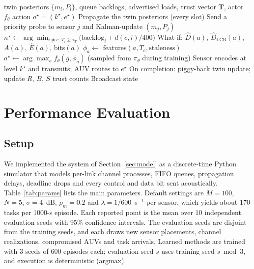 \documentclass[lettersize,journal]{IEEEtran}
\begin{document}
\begin{algorithm}[!t]
\caption{UT-SMART Decision at AUV $c$ for Task $\tau$ From Sensor $j$}
\label{alg:utsmart}
\begin{algorithmic}[1]
\REQUIRE twin posteriors $\{m_l,P_l\}$, queue backlogs, advertised loads, trust vector $\mathbf{T}$, actor $f_\theta$
\ENSURE action $a^\star=(k^\star,e^\star)$
\STATE Propagate the twin posteriors (every slot)
\STATE Send a priority probe to sensor $j$ and Kalman-update $(m_j,P_j)$
\ENDIF
\STATE $n^\star \leftarrow \arg\min_{i\neq c,\,T_i\ge\tau_T}\big(\text{backlog}_i + d(c,i)/400\big)$
\STATE What-if: $\hat D(a)$, $\hat D_{\mathrm{LCB}}(a)$, $A(a)$, $\hat E(a)$, bits$(a)$
\STATE $\phi_a \leftarrow$ features$(a, T_e, \text{staleness})$
\ENDFOR
\STATE $a^\star \leftarrow \arg\max_a f_\theta(g,\phi_a)$ (sampled from $\pi_\theta$ during training)
\STATE Sensor encodes at level $k^\star$ and transmits; AUV routes to $e^\star$
\STATE On completion: piggy-back twin update; update $R$, $B$, $S$ trust counts
\STATE Broadcast state
\ENDIF
\end{algorithmic}
\end{algorithm}

\section{Performance Evaluation}\label{sec:eval}

\subsection{Setup}
We implemented the system of Section~\ref{sec:model} as a discrete-time Python simulator that models per-link channel processes, FIFO queues, propagation delays, deadline drops and every control and data bit sent acoustically. Table~\ref{tab:params} lists the main parameters. Default settings are $M=100$, $N=5$, $\sigma=4$~dB, $\rho_m=0.2$ and $\lambda=1/600$~s$^{-1}$ per sensor, which yields about 170 tasks per 1000-s episode. Each reported point is the mean over 10 independent evaluation seeds with 95\% confidence intervals. The evaluation seeds are disjoint from the training seeds, and each draws new sensor placements, channel realizations, compromised AUVs and task arrivals. Learned methods are trained with 3 seeds of 600 episodes each; evaluation seed $s$ uses training seed $s \bmod 3$, and execution is deterministic (argmax).
\end{document}
